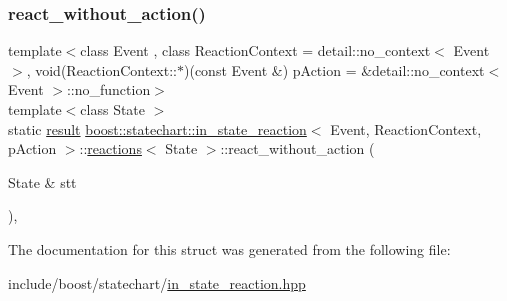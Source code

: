 \subsubsection{\texorpdfstring{react\+\_\+without\+\_\+action()}{react\_without\_action()}}
{\footnotesize\ttfamily template$<$class Event , class Reaction\+Context  = detail\+::no\+\_\+context$<$ Event $>$, void(\+Reaction\+Context\+::$\ast$)(const Event \&) p\+Action = \&detail\+::no\+\_\+context$<$ Event $>$\+::no\+\_\+function$>$ \\
template$<$class State $>$ \\
static \mbox{\hyperlink{namespaceboost_1_1statechart_abe807f6598b614d6d87bb951ecd92331}{result}} \mbox{\hyperlink{classboost_1_1statechart_1_1in__state__reaction}{boost\+::statechart\+::in\+\_\+state\+\_\+reaction}}$<$ Event, Reaction\+Context, p\+Action $>$\+::\mbox{\hyperlink{structboost_1_1statechart_1_1in__state__reaction_1_1reactions}{reactions}}$<$ State $>$\+::react\+\_\+without\+\_\+action (\begin{DoxyParamCaption}\item[{State \&}]{stt }\end{DoxyParamCaption})\hspace{0.3cm}{\ttfamily [inline]}, {\ttfamily [static]}}



The documentation for this struct was generated from the following file\+:\begin{DoxyCompactItemize}
\item 
include/boost/statechart/\mbox{\hyperlink{in__state__reaction_8hpp}{in\+\_\+state\+\_\+reaction.\+hpp}}\end{DoxyCompactItemize}
